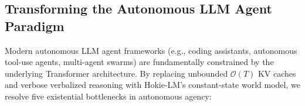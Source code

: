 \subsection{Transforming the Autonomous LLM Agent Paradigm}
\label{sec:agent_paradigm}

Modern autonomous LLM agent frameworks (e.g., coding assistants, autonomous tool-use agents, multi-agent swarms) are fundamentally constrained by the underlying Transformer architecture. By replacing unbounded $\mathcal{O}(T)$ KV caches and verbose verbalized reasoning with Hokie-LM's constant-state world model, we resolve five existential bottlenecks in autonomous agency:

